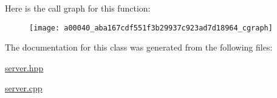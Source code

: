 Here is the call graph for this function\-:\nopagebreak
\begin{figure}[H]
\begin{center}
\leavevmode
\texttt{[image: a00040\_aba167cdf551f3b29937c923ad7d18964\_cgraph]}
\end{center}
\end{figure}




The documentation for this class was generated from the following files\-:\begin{DoxyCompactItemize}
\item 
\hyperlink{a00077}{server.\-hpp}\item 
\hyperlink{a00076}{server.\-cpp}\end{DoxyCompactItemize}
